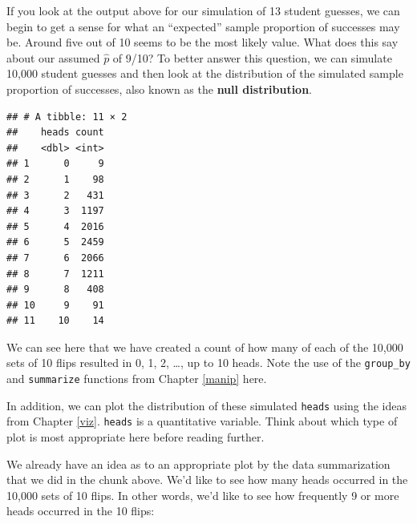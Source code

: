 \documentclass[]{tufte-book}
\newenvironment{Shaded}{\begin{snugshade}}{\end{snugshade}}
\newcommand{\KeywordTok}[1]{\textcolor[rgb]{0.13,0.29,0.53}{\textbf{{#1}}}}
\newcommand{\DataTypeTok}[1]{\textcolor[rgb]{0.13,0.29,0.53}{{#1}}}
\newcommand{\DecValTok}[1]{\textcolor[rgb]{0.00,0.00,0.81}{{#1}}}
\newcommand{\StringTok}[1]{\textcolor[rgb]{0.31,0.60,0.02}{{#1}}}
\newcommand{\NormalTok}[1]{{#1}}
\begin{document}
If you look at the output above for our simulation of 13 student
guesses, we can begin to get a sense for what an ``expected'' sample
proportion of successes may be. Around five out of 10 seems to be the
most likely value. What does this say about our assumed \(\hat{p}\) of
9/10? To better answer this question, we can simulate 10,000 student
guesses and then look at the distribution of the simulated sample
proportion of successes, also known as the \textbf{null distribution}.

\begin{Shaded}
\end{Shaded}

\begin{verbatim}
## # A tibble: 11 × 2
##    heads count
##    <dbl> <int>
## 1      0     9
## 2      1    98
## 3      2   431
## 4      3  1197
## 5      4  2016
## 6      5  2459
## 7      6  2066
## 8      7  1211
## 9      8   408
## 10     9    91
## 11    10    14
\end{verbatim}

We can see here that we have created a count of how many of each of the
10,000 sets of 10 flips resulted in 0, 1, 2, \ldots{}, up to 10 heads.
Note the use of the \texttt{group\_by} and \texttt{summarize} functions
from Chapter \ref{manip} here.

In addition, we can plot the distribution of these simulated
\texttt{heads} using the ideas from Chapter \ref{viz}. \texttt{heads} is
a quantitative variable. Think about which type of plot is most
appropriate here before reading further.

We already have an idea as to an appropriate plot by the data
summarization that we did in the chunk above. We'd like to see how many
heads occurred in the 10,000 sets of 10 flips. In other words, we'd like
to see how frequently 9 or more heads occurred in the 10 flips:

\begin{Shaded}
\end{Shaded}
\end{document}
